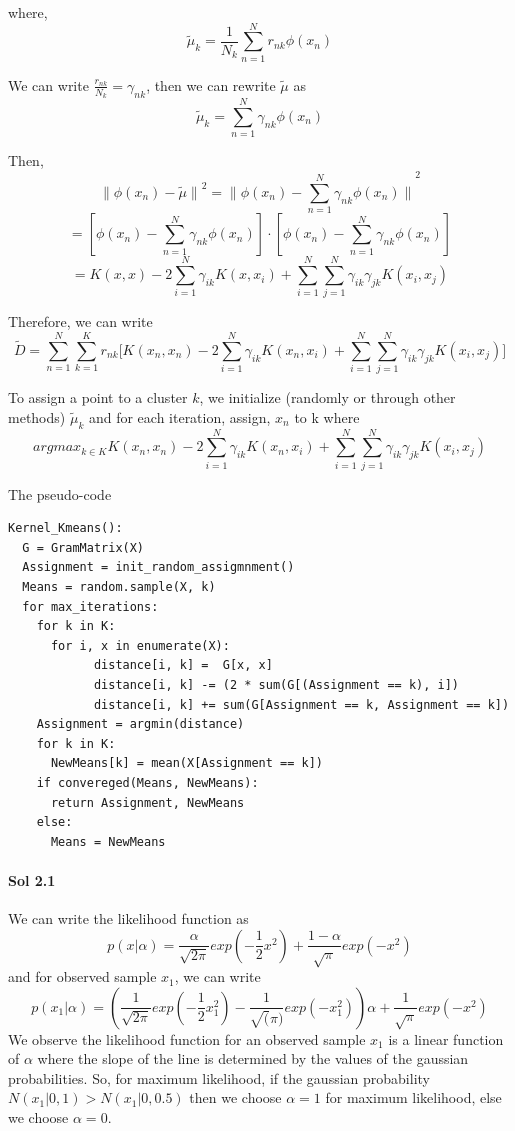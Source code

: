 \documentclass[]{report}
\begin{document}
	where, 
	\begin{equation}
		\tilde{\mu}_k = \frac{1}{N_k} \sum_{n=1}^N r_{nk} \phi (x_n)
	\end{equation}

	We can write $\frac{r_{nk}}{N_k} = \gamma_{nk}$, then we can rewrite $\tilde{\mu}$ as 
	\[ \tilde{\mu}_k = \sum_{n=1}^N \gamma_{nk} \phi (x_n) \]
	
	Then, 
	\[ {\| \phi(x_n) - \tilde{\mu}\|}^2 = {\| \phi(x_n) - \sum_{n=1}^N \gamma_{nk} \phi (x_n) \|}^2 \]
	\[ = [\phi(x_n) - \sum_{n=1}^N \gamma_{nk} \phi (x_n)] \cdot [\phi(x_n) - \sum_{n=1}^N \gamma_{nk} \phi (x_n)] \]
	\[ = K(x, x) - 2 \sum_{i=1}^N \gamma_{ik} K(x, x_i) + \sum_{i=1}^N \sum_{j=1}^N \gamma_{ik} \gamma_{jk} K(x_i, x_j) \]

	Therefore, we can write
	\[ \tilde{D} = \sum_{n=1}^N \sum_{k=1}^K r_{nk} \big[ K(x_n, x_n) - 2 \sum_{i=1}^N \gamma_{ik} K(x_n, x_i) + \sum_{i=1}^N \sum_{j=1}^N \gamma_{ik} \gamma_{jk} K(x_i, x_j) \big] \]

	To assign a point to a cluster $k$, we initialize (randomly or through other methods) $\tilde{\mu}_k$ and for each iteration, assign, $x_n$ to k where
	\[ argmax_{k \in K} K(x_n, x_n) - 2 \sum_{i=1}^N \gamma_{ik} K(x_n, x_i) + \sum_{i=1}^N \sum_{j=1}^N \gamma_{ik} \gamma_{jk} K(x_i, x_j) \]

	The pseudo-code 
	\newpage

\begin{lstlisting}
Kernel_Kmeans():
  G = GramMatrix(X)
  Assignment = init_random_assigmnment()
  Means = random.sample(X, k)
  for max_iterations:
  	for k in K:
  	  for i, x in enumerate(X):
	        distance[i, k] =  G[x, x] 
	        distance[i, k] -= (2 * sum(G[(Assignment == k), i]) 
	        distance[i, k] += sum(G[Assignment == k, Assignment == k]) 
    Assignment = argmin(distance)
    for k in K:
      NewMeans[k] = mean(X[Assignment == k])
    if convereged(Means, NewMeans):
      return Assignment, NewMeans
    else:
      Means = NewMeans
\end{lstlisting}


\paragraph{Sol 2.1}
	We can write the likelihood function as 
	\[ p(x | \alpha) = \frac{\alpha}{\sqrt{2 \pi}} exp(-\frac{1}{2} x^2) + \frac{1 - \alpha}{\sqrt{\pi}} exp(- x^2)\]
	and for observed sample $x_1$, we can write
	\[ p(x_1 | \alpha) = (\frac{1}{\sqrt{2 \pi}} exp(-\frac{1}{2}x_1^2) - \frac{1}{\sqrt(\pi)} exp(-x_1^2)) \alpha + \frac{1}{\sqrt{\pi}} exp(-x^2) \]
	We observe the likelihood function for an observed sample $x_1$ is a linear function of $\alpha$ where the slope of the line is determined by the values of the gaussian probabilities. So, for maximum likelihood, if the gaussian probability $N(x_1 | 0, 1) > N(x_1|0, 0.5)$ then we choose $\alpha = 1$ for maximum likelihood, else we choose $\alpha = 0$.
\end{document}
